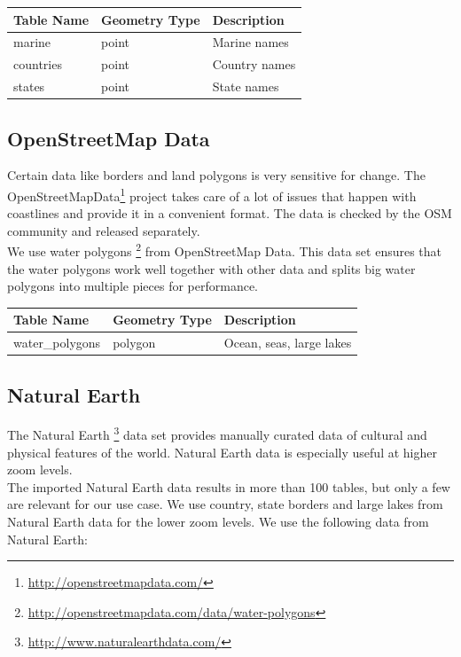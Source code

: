 \begin{flushleft}
    \begin{tabular}{lll}
    \hline
    Table Name   & Geometry Type & Description \\
    \hline                                          
    marine       & point    & Marine names \\
    countries    & point    & Country names \\
    states       & point    & State names \\
    \end{tabular}
\end{flushleft}

\subsection{OpenStreetMap Data}

Certain \osm{} data like borders and land polygons is very sensitive for change.
The OpenStreetMapData\footnote{\url{http://openstreetmapdata.com/}}
project takes care of a lot of issues that happen with coastlines
and provide it in a convenient format. The data is checked by the OSM community
and released separately.
\\
We use water polygons \footnote{\url{http://openstreetmapdata.com/data/water-polygons}} from OpenStreetMap Data. This data set ensures that the water polygons
work well together with other \osm{} data and splits big water polygons into multiple 
pieces for performance.

\begin{flushleft}
    \begin{tabular}{lll}
    \hline
    Table Name            & Geometry Type & Description \\
    \hline
    water\_polygons        & polygon       & Ocean, seas, large lakes           \\
    \end{tabular}
\end{flushleft}

\newpage
\subsection{Natural Earth}

The Natural Earth \footnote{\url{http://www.naturalearthdata.com/}} data set provides manually curated data of cultural and physical features of the world. Natural Earth data is especially useful at higher zoom levels.
\\
The imported Natural Earth data results in more than 100 tables, but only a few
are relevant for our use case.
We use country, state borders and large lakes from Natural Earth data for the lower zoom
levels.
We use the following data from Natural Earth:

